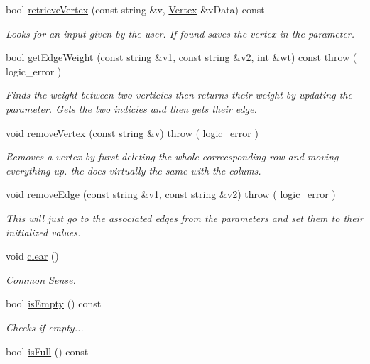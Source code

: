 \begin{DoxyCompactItemize}
bool \hyperlink{class_weighted_graph_a3afabc2236c99dac950f5161f715f114}{retrieve\+Vertex} (const string \&v, \hyperlink{class_weighted_graph_1_1_vertex}{Vertex} \&v\+Data) const 
\begin{DoxyCompactList}\small\item\em Looks for an input given by the user. If found saves the vertex in the parameter. \end{DoxyCompactList}\item 
bool \hyperlink{class_weighted_graph_ab136044e7378313087be69eb43e7f042}{get\+Edge\+Weight} (const string \&v1, const string \&v2, int \&wt) const   throw ( logic\+\_\+error )
\begin{DoxyCompactList}\small\item\em Finds the weight between two verticies then returns their weight by updating the parameter. Gets the two indicies and then gets their edge. \end{DoxyCompactList}\item 
void \hyperlink{class_weighted_graph_abaaa572a9b1a60ec3cd99d8db9d9590e}{remove\+Vertex} (const string \&v)  throw ( logic\+\_\+error )
\begin{DoxyCompactList}\small\item\em Removes a vertex by furst deleting the whole correcsponding row and moving everything up. the does virtually the same with the colums. \end{DoxyCompactList}\item 
void \hyperlink{class_weighted_graph_a1db455249fa7fedf70aa5683487a17df}{remove\+Edge} (const string \&v1, const string \&v2)  throw ( logic\+\_\+error )
\begin{DoxyCompactList}\small\item\em This will just go to the associated edges from the parameters and set them to their initialized values. \end{DoxyCompactList}\item 
void \hyperlink{class_weighted_graph_a26890ebf74d23821a6e4dbcf803b5002}{clear} ()
\begin{DoxyCompactList}\small\item\em Common Sense. \end{DoxyCompactList}\item 
\hypertarget{class_weighted_graph_a1c03a0f68447cf88fed97c2076501702}{bool \hyperlink{class_weighted_graph_a1c03a0f68447cf88fed97c2076501702}{is\+Empty} () const }\label{class_weighted_graph_a1c03a0f68447cf88fed97c2076501702}

\begin{DoxyCompactList}\small\item\em Checks if empty... \end{DoxyCompactList}\item 
\hypertarget{class_weighted_graph_a22e56836e3967031a657cfa9ea5b9843}{bool \hyperlink{class_weighted_graph_a22e56836e3967031a657cfa9ea5b9843}{is\+Full} () const }\label{class_weighted_graph_a22e56836e3967031a657cfa9ea5b9843}


\end{DoxyCompactItemize}
